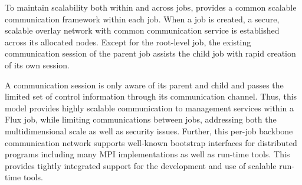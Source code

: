 
To maintain scalability both within and across jobs, \flux 
provides a common scalable communication 
framework within each job. When a \flux job is created, a secure, scalable 
overlay network with common communication service is established 
across its allocated nodes. Except for the root-level job, 
the existing communication session of the parent job assists 
the child job with rapid creation of its own session. 

A communication session is only aware of its parent 
and child and passes the limited set of control information 
through its communication channel. Thus, this model 
provides highly scalable communication to management
services within a Flux job, while 
limiting communications between jobs, addressing 
both the multidimensional scale as well as security issues.
Further, this per-job backbone communication network 
supports well-known bootstrap interfaces 
for distributed programs including many MPI implementations 
as well as run-time tools. This provides tightly integrated support
for the development and use of scalable run-time tools.
